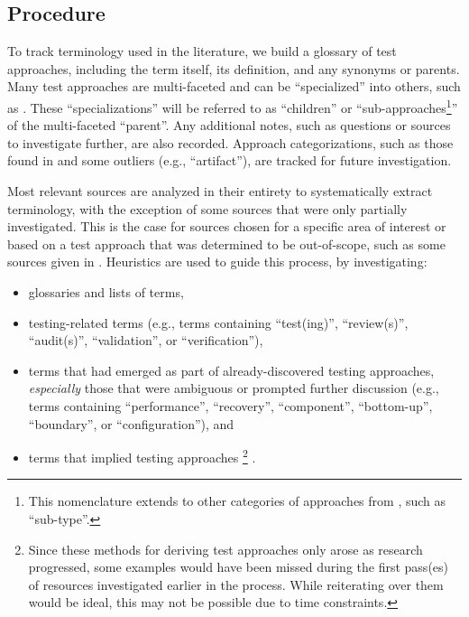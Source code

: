 \subsection{Procedure}

To track terminology used in the literature, we build a glossary of test
approaches, including the term itself, its definition, and
any synonyms or parents. Many test approaches are multi-faceted and can be
``specialized'' into others, such as . These
``specializations'' will be referred to as ``children'' or
``sub-approaches\footnote{This nomenclature extends to other categories of
    approaches from , such as ``sub-type''.}''
of the multi-faceted
``parent''. Any additional notes, such as questions or sources to investigate
further, are also recorded. Approach categorizations, such as those found in
 and some outliers (e.g., ``artifact''), are tracked
for future investigation.

Most relevant sources are analyzed in their entirety to systematically extract
terminology, with the exception of some sources that were only partially
investigated. This is the case for sources chosen for a specific area of
interest or based on a test approach that was determined to be out-of-scope,
such as some sources given in .
Heuristics are used to guide this process, by investigating:

\begin{itemize}
    \item glossaries and lists of terms,
    \item testing-related terms (e.g., terms containing ``test(ing)'',
          \ifnotpaper ``review(s)'', ``audit(s)'', \fi
          ``validation'', or ``verification''),
    \item terms that had emerged as part of already-discovered
          testing approaches, \emph{especially} those that were ambiguous
          or prompted further discussion (e.g., terms containing
          ``performance'', ``recovery'', ``component'', ``bottom-up'',
          \ifnotpaper ``boundary'', \fi or ``configuration''), and
    \item terms that implied testing approaches%
          \ifnotpaper\footnote{
                  Since these methods for deriving test approaches only arose
                  as research progressed, some examples would have been missed
                  during the first pass(es) of resources investigated earlier
                  in the process. While reiterating over them would be ideal,
                  this may not be possible due to time constraints.
              }\fi%
          .
\end{itemize}

